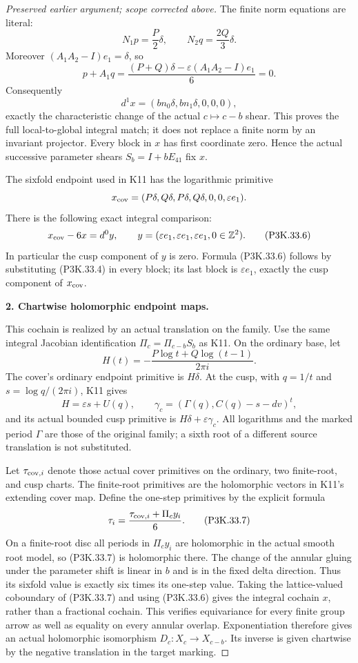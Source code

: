 \begin{proof}[Preserved earlier argument; scope corrected above]
The finite norm equations are literal:
\[
 N_1p=\frac P2\delta,\qquad
 N_2q=\frac{2Q}3\delta.
\]
Moreover
\((A_1A_2-I)e_1=\delta\), so
\[
 p+A_1q=\frac{(P+Q)\delta-\varepsilon(A_1A_2-I)e_1}{6}=0.
\]
Consequently
\[
 d^1x=(bn_0\delta,bn_1\delta,0,0,0),                 \tag{P3K.33.5}
\]
exactly the characteristic change of the actual \(c\mapsto c-b\)
shear. This proves the full local-to-global integral match; it
does not replace a finite norm by an invariant projector.
Every block in \(x\) has first coordinate zero. Hence the actual
successive parameter shears \(S_b=I+bE_{41}\) fix \(x\).

The sixfold endpoint used in K11 has the logarithmic primitive
\[
 x_{\rm cov}=(P\delta,Q\delta,P\delta,Q\delta,0,0,\varepsilon e_1).
\]
There is the following exact integral comparison:
\[
 x_{\rm cov}-6x=d^0y,\qquad
 y=(\varepsilon e_1,\varepsilon e_1,\varepsilon e_1,
       0\in\mathbb Z^2).                             \tag{P3K.33.6}
\]
In particular the cusp component of \(y\) is zero. Formula
(P3K.33.6) follows by substituting (P3K.33.4) in every block; its last
block is \(\varepsilon e_1\), exactly the cusp component of
\(x_{\rm cov}\).

\par\medskip\noindent\textbf{2. Chartwise holomorphic endpoint maps.}\enspace

This cochain is realized by an actual translation on the family.
Use the same integral Jacobian identification
\(\Pi_c=\Pi_{c-b}S_b\) as K11. On the ordinary base, let
\[
 H(t)=-\frac{P\log t+Q\log(t-1)}{2\pi i}.
\]
The cover's ordinary endpoint primitive is \(H\delta\).
At the cusp, with \(q=1/t\) and
\(s=\log q/(2\pi i)\), K11 gives
\[
 H=\varepsilon s+U(q),\qquad
 \gamma_c=(\Gamma(q),C(q)-s-dv)^t,
\]
and its actual bounded cusp primitive is
\(H\delta+\varepsilon\gamma_c\).
All logarithms and the marked period \(\Gamma\) are those of
the original family; a sixth root of a different source
translation is not substituted.

Let \(\tau_{{\rm cov},i}\) denote those actual cover primitives
on the ordinary, two finite-root, and cusp charts. The finite-root
primitives are the holomorphic vectors in K11's extending cover
map. Define the one-step primitives by the explicit formula
\[
       \tau_i=\frac{\tau_{{\rm cov},i}+\Pi_cy_i}{6}.
                                                               \tag{P3K.33.7}
\]
On a finite-root disc all periods in \(\Pi_c y_i\) are
holomorphic in the actual smooth root model, so (P3K.33.7) is
holomorphic there. The change of the annular gluing under the
parameter shift is linear in \(b\) and is in the fixed delta
direction. Thus its sixfold value is exactly six times its
one-step value. Taking the lattice-valued coboundary of (P3K.33.7)
and using (P3K.33.6) gives the integral cochain \(x\), rather
than a fractional cochain. This verifies equivariance for every
finite group arrow as well as equality on every annular overlap.
Exponentiation therefore gives an actual holomorphic isomorphism
\(D_c:X_c\longrightarrow X_{c-b}\). Its inverse is given
chartwise by the negative translation in the target marking.


\end{proof}
